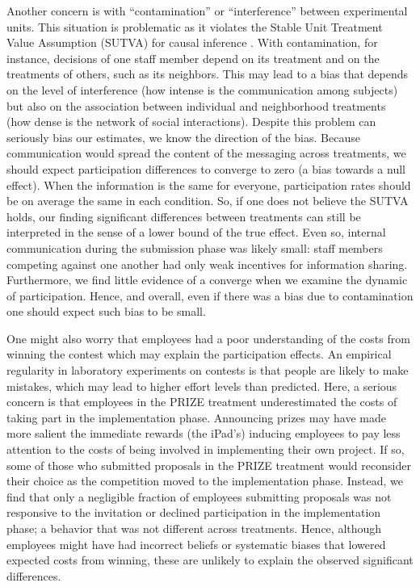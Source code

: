 \documentclass[11pt, titlepage]{article}
\begin{document}
Another concern is with ``contamination'' or ``interference'' between
experimental units. This situation is problematic as it violates the
Stable Unit Treatment Value Assumption (SUTVA) for causal inference
\citep{rubin1974estimating}. With contamination, for instance, decisions
of one staff member depend on its treatment and on the treatments of
others, such as its neighbors. This may lead to a bias that depends on
the level of interference (how intense is the communication among
subjects) but also on the association between individual and
neighborhood treatments (how dense is the network of social
interactions). Despite this problem can seriously bias our estimates, we
know the direction of the bias. Because communication would spread the
content of the messaging across treatments, we should expect
participation differences to converge to zero (a bias towards a null
effect). When the information is the same for everyone, participation
rates should be on average the same in each condition. So, if one does
not believe the SUTVA holds, our finding significant differences between
treatments can still be interpreted in the sense of a lower bound of the
true effect. Even so, internal communication during the submission phase
was likely small: staff members competing against one another had only
weak incentives for information sharing. Furthermore, we find little
evidence of a converge when we examine the dynamic of participation.
Hence, and overall, even if there was a bias due to contamination one
should expect such bias to be small.

One might also worry that employees had a poor understanding of the
costs from winning the contest which may explain the participation
effects. An empirical regularity in laboratory experiments on contests
\citep[see][]{dechenaux2014survey} is that people are likely to make
mistakes, which may lead to higher effort levels than predicted. Here, a
serious concern is that employees in the PRIZE treatment underestimated
the costs of taking part in the implementation phase. Announcing prizes
may have made more salient the immediate rewards (the iPad's) inducing
employees to pay less attention to the costs of being involved in
implementing their own project. If so, some of those who submitted
proposals in the PRIZE treatment would reconsider their choice as the
competition moved to the implementation phase. Instead, we find that
only a negligible fraction of employees submitting proposals was not
responsive to the invitation or declined participation in the
implementation phase; a behavior that was not different across
treatments. Hence, although employees might have had incorrect beliefs
or systematic biases that lowered expected costs from winning, these are
unlikely to explain the observed significant differences.
\end{document}
